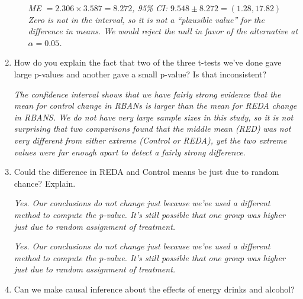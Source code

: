 \begin{enumerate}
\begin{enumerate}
\begin{key}
  {\it  ME $=2.306 \times 3.587 =8.272 $, 95\% CI:   $9.548 \pm  
    8.272 = ( 1.28, 17.82)$ Zero is not in the interval, so it is not
    a ``plausible value'' for the difference in means.  We would
    reject the null in favor of the alternative at $\alpha = 0.05$.  }
\end{key}

   \end{enumerate}

 \item   How do you explain the fact that two of the three
   t-tests we've done gave large p-values and another gave a small p-value? Is
   that inconsistent? 
\begin{students}
    \vspace{3cm}    
\end{students}

\begin{key}
  {\it  The confidence interval shows that we have
    fairly strong evidence that the mean for control change in RBANs is
    larger than the mean for REDA change in RBANS. We do not have very
    large sample sizes in this study, so it is not surprising that two
    comparisons found that the middle mean (RED) was not very
    different from either extreme (Control or REDA), yet the two
    extreme values were far enough apart to detect a fairly strong
    difference. }
\end{key}

\item Could the difference in REDA and Control means be just due to
  random chance?  Explain.
\begin{students}
    \vspace{2cm}    
\end{students}

\begin{key}
  {\it Yes.  Our conclusions do not change just because we've used a
    different method to compute the p-value.  It's still possible that
  one group was higher just due to random assignment of treatment.}
\end{key}
\begin{students}
    \vspace{2cm}    
\end{students}

\begin{key}
  {\it Yes.  Our conclusions do not change just because we've used a
    different method to compute the p-value.  It's still possible that
  one group was higher just due to random assignment of treatment.}
\end{key}
\item Can we make causal inference about the effects of energy drinks
  and alcohol?
\begin{students}
    \vspace{2cm}    
\end{students}


\end{enumerate}
